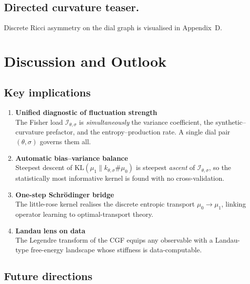 \documentclass{article}
\theoremstyle{plain}
\theoremstyle{definition}
\theoremstyle{remark}
\begin{document}
		\subsection{Directed curvature teaser.}
			Discrete Ricci asymmetry on the dial graph is visualised in Appendix~D.


\section{Discussion and Outlook}
	\subsection{Key implications}   %
		\begin{enumerate}[label=\textbf{(I\arabic*)},leftmargin=*]
 			\item \textbf{Unified diagnostic of fluctuation strength}\\ The Fisher load $\mathcal I_{\theta,\sigma}$ is \emph{simultaneously} the variance coefficient, the synthetic–curvature prefactor, and the entropy–production rate.  A single dial pair $(\theta, \sigma)$ governs them all.
			
			\item \textbf{Automatic bias–variance balance}\\ 
				Steepest descent of $\mathrm{KL}(\mu_1\parallel k_{\theta,\sigma}\!\#\mu_0)$ is steepest \emph{ascent} of $\mathcal I_{\theta,\sigma}$, so the statistically most informative kernel is found with no cross-validation.
			
			\item \textbf{One-step Schrödinger bridge}\\ 
				The little-rose kernel realises the discrete entropic transport $\mu_0\!\to\!\mu_1$, linking operator learning to optimal-transport theory.
			
			\item \textbf{Landau lens on data}\\
				The Legendre transform of the CGF equips any observable with a Landau-type free-energy landscape whose stiffness is data-computable.
		\end{enumerate}

	\subsection{Future directions}
		
\end{document}

